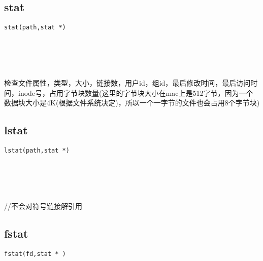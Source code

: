 \documentclass[10pt,a4paper]{article}
\begin{document}
\section{\color[rgb]{0.2,0.4,0.6}{文件信息}}
\subsection{stat}
\begin{spacing}{2.0}
\lstset{language=C,numbers=none}
\begin{lstlisting}
stat(path,stat *)
\end{lstlisting}
{\large\color[rgb]{0.2,0.4,0.6}{path:}} \\
{\large\color[rgb]{0.2,0.4,0.6}{*:}}
\paragraph{ \ \ }检查文件属性，类型，大小，链接数，用户id，组id，最后修改时间，最后访问时间，inode号，占用字节块数量(这里的字节块大小在mac上是512字节，因为一个数据块大小是4K(根据文件系统决定)，所以一个一字节的文件也会占用8个字节块)
\end{spacing}

\subsection{lstat}
\begin{spacing}{2.0}
\lstset{language=C,numbers=none}
\begin{lstlisting}
lstat(path,stat *)
\end{lstlisting}
{\large\color[rgb]{0.2,0.4,0.6}{path:}} \\
{\large\color[rgb]{0.2,0.4,0.6}{*:}}
\paragraph{ \ \ }//不会对符号链接解引用
\end{spacing}

\subsection{fstat}
\begin{spacing}{2.0}
\lstset{language=C,numbers=none}
\begin{lstlisting}
fstat(fd,stat * )
\end{lstlisting}
{\large\color[rgb]{0.2,0.4,0.6}{fd:}} \\
{\large\color[rgb]{0.2,0.4,0.6}{:}}
\paragraph{ \ \ }
\end{spacing}
\end{document}
